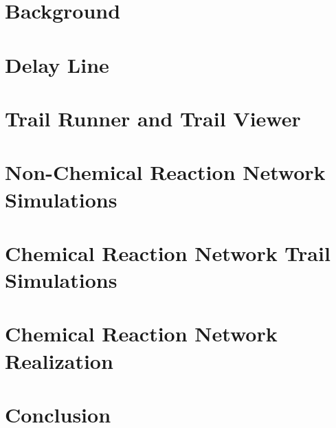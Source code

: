 \documentclass[12pt,oneside,letterpaper]{PSUreport}
\begin{document}
\glsresetall
\chapter{Background}
\label{chap:background}
  

\glsresetall
\chapter{Delay Line}
\label{chap:delay_line}


\glsresetall
\chapter{Trail Runner and Trail Viewer}
\label{chap:trail_runner}


\glsresetall
\chapter{Non-Chemical Reaction Network Simulations}
\label{chap:non_crn_testing}


\glsresetall
\chapter{Chemical Reaction Network Trail Simulations}
\label{chap:trail_simulations}


\glsresetall
\chapter{Chemical Reaction Network Realization}
\label{chap:chem_real}


\glsresetall
\chapter{Conclusion}
\label{chap:conclusion}







\appendix

\end{document}
